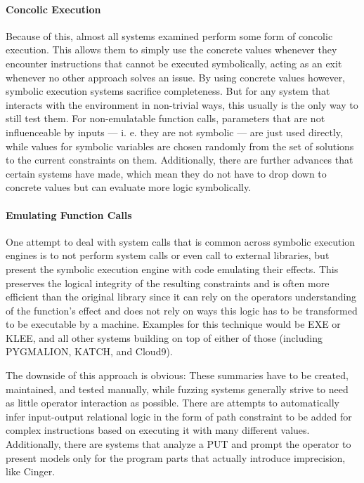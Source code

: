 \documentclass{article}
\begin{document}
\begin{multicols}{2}
  \paragraph{Concolic Execution}
  Because of this, almost all systems examined perform some form of concolic execution. This allows them to simply use the concrete values whenever they encounter instructions that cannot be executed symbolically, acting as an exit whenever no other approach solves an issue. By using concrete values however, symbolic execution systems sacrifice completeness. But for any system that interacts with the environment in non-trivial ways, this usually is the only way to still test them. For non-emulatable function calls, parameters that are not influenceable by inputs — i. e. they are not symbolic — are just used directly, while values for symbolic variables are chosen randomly from the set of solutions to the current constraints on them.\cite{PreliminaryAssessment} Additionally, there are further advances that certain systems have made, which mean they do not have to drop down to concrete values but can evaluate more logic symbolically.

  \paragraph{Emulating Function Calls}
  One attempt to deal with system calls that is common across symbolic execution engines is to not perform system calls or even call to external libraries, but present the symbolic execution engine with code emulating their effects. This preserves the logical integrity of the resulting constraints and is often more efficient than the original library since it can rely on the operators understanding of the function's effect and does not rely on ways this logic has to be transformed to be executable by a machine. Examples for this technique would be EXE\cite{EXE} or KLEE\cite{KLEE}, and all other systems building on top of either of those (including PYGMALION\cite{PYGMALION}, KATCH\cite{KATCH}, and Cloud9\cite{Cloud9}).

  The downside of this approach is obvious: These summaries have to be created, maintained, and tested manually, while fuzzing systems generally strive to need as little operator interaction as possible. There are attempts to automatically infer input-output relational logic in the form of path constraint to be added for complex instructions based on executing it with many different values\cite{ASSIE}. Additionally, there are systems that analyze a PUT and prompt the operator to present models only for the program parts that actually introduce imprecision, like Cinger\cite{Cinger}.


\end{multicols}
\end{document}

